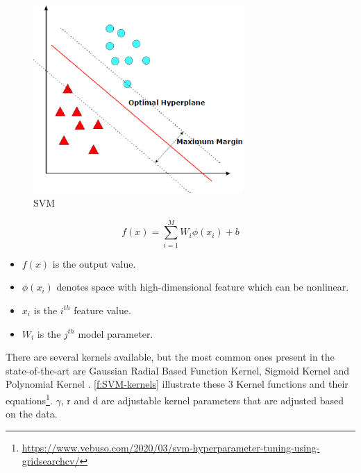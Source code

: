 \begin{figure}[h]
\centering
\includegraphics[width=8cm]{figures/Ch2/SVM.png}
\caption{SVM \cite{Hussain2011}}
\label{f:SVM}
\end{figure}

\begin{equation}\label{eq:SVR}
    f(x) = \sum_{i=1}^{M} W_i \phi(x_i) + b
\end{equation}

\begin{itemize}
    \item \begin{math}f(x)\end{math} is the output value.
    \item \begin{math}\phi(x_i)\end{math} denotes space with high-dimensional feature which can be nonlinear.
    \item \begin{math}x_i\end{math} is the \begin{math}i^{th}\end{math} feature value.
    \item \begin{math}W_i\end{math} is the \begin{math}j^{th}\end{math} model parameter.
\end{itemize}

There are several kernels available, but the most common ones present in the state-of-the-art are Gaussian Radial Based Function Kernel, Sigmoid Kernel and Polynomial Kernel \cite{Hussain2011}. \autoref{f:SVM-kernels} illustrate these 3 Kernel functions and their equations\footnote{\url{https://www.vebuso.com/2020/03/svm-hyperparameter-tuning-using-gridsearchcv/}}.
\begin{math}\gamma \end{math}, r and d are adjustable kernel parameters that are adjusted based on the data.

